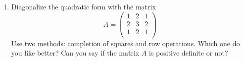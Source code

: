 \documentclass[../psets.tex]{subfiles}
\begin{document}
\begin{enumerate}[label={\textbf{2.\arabic*.}}]
    \item Diagonalize the quadratic form with the matrix
    \begin{equation*}
        A =
        \begin{pmatrix}
            1 & 2 & 1\\
            2 & 3 & 2\\
            1 & 2 & 1\\
        \end{pmatrix}
    \end{equation*}
    Use two methods: completion of squares and row operations. Which one do you like better? Can you say if the matrix $A$ is positive definite or not?
\end{enumerate}
\end{document}
